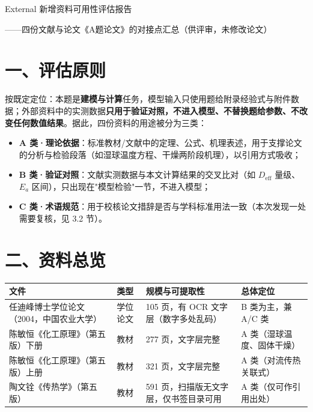 \documentclass[12pt,a4paper]{ctexart}
\begin{document}
\begin{center}
{\heiti{} External 新增资料可用性评估报告\par}
\vspace{0.4em}
{\heiti{} ——四份文献与论文《A题论文》的对接点汇总（供评审，未修改论文）\par}
\end{center}

\section{一、评估原则}

按既定定位：本题是\textbf{建模与计算}任务，模型输入只使用题给附录经验式与附件数据；外部资料中的实测数据\textbf{只用于验证对照，不进入模型、不替换题给参数、不改变任何数值结果}。据此，四份资料的用途被分为三类：

\begin{itemize}[leftmargin=2em]
\item \textbf{A 类·理论依据}：标准教材/文献中的定理、公式、机理表述，用于支撑论文的分析与检验段落（如湿球温度方程、干燥两阶段机理），以引用方式吸收；
\item \textbf{B 类·验证对照}：文献实测数据与本文计算结果的交叉比对（如 $D_{\mathrm{eff}}$ 量级、$E_a$ 区间），只出现在"模型检验"一节，不进入模型；
\item \textbf{C 类·术语规范}：用于校核论文措辞是否与学科标准用法一致（本次发现一处需要复核，见 3.2 节）。
\end{itemize}

\section{二、资料总览}

\begin{center}
{\begin{tabular}{llll}
\toprule
文件 & 类型 & 规模与可提取性 & 总体定位 \\
\midrule
任迪峰博士学位论文（2004，中国农业大学） & 学位论文 & 105 页，有 OCR 文字层（数字多处乱码） & B 类为主，兼 A/C 类 \\
陈敏恒《化工原理》（第五版）下册 & 教材 & 277 页，文字层完整 & A 类（湿球温度、固体干燥） \\
陈敏恒《化工原理》（第五版）上册 & 教材 & 321 页，文字层完整 & A 类（对流传热关联式） \\
陶文铨《传热学》（第五版） & 教材 & 591 页，扫描版无文字层，仅书签目录可用 & A 类（仅可作引用出处） \\
\bottomrule
\end{tabular}}
\end{center}
\end{document}

